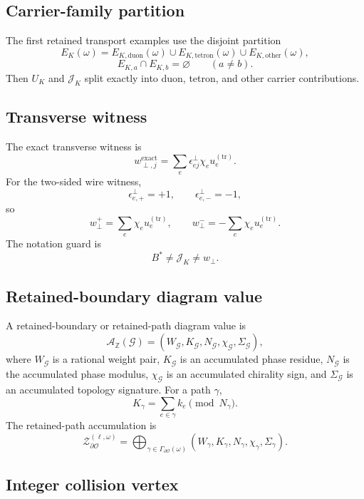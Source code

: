 \subsection{Carrier-family partition}
\label{appD:carrier-partition}

The first retained transport examples use the disjoint partition
\[
E_K(\omega)=E_{K,\mathrm{duon}}(\omega)\cup E_{K,\mathrm{tetron}}(\omega)\cup E_{K,\mathrm{other}}(\omega),
\]
\[
E_{K,a}\cap E_{K,b}=\varnothing\qquad(a\neq b).
\]
Then \(U_K\) and \(\mathcal J_K\) split exactly into duon, tetron, and other carrier contributions.

\subsection{Transverse witness}
\label{appD:transverse-witness}

The exact transverse witness is
\[
w_{\perp,j}^{\mathrm{exact}}=
\sum_e \epsilon_{ej}^{\perp}\chi_eu_e^{(\mathrm{tr})}.
\]
For the two-sided wire witness,
\[
\epsilon_{e,+}^{\perp}=+1,
\qquad
\epsilon_{e,-}^{\perp}=-1,
\]
so
\[
w_{\perp}^{+}=\sum_e\chi_eu_e^{(\mathrm{tr})},
\qquad
w_{\perp}^{-}=-\sum_e\chi_eu_e^{(\mathrm{tr})}.
\]
The notation guard is
\[
\boxed{B^*\neq \mathcal J_K\neq w_\perp}.
\]

\subsection{Retained-boundary diagram value}
\label{appD:retained-boundary-diagram-value}

A retained-boundary or retained-path diagram value is
\[
\mathcal A_{\mathbb Z}(\mathcal G)=
(W_{\mathcal G},K_{\mathcal G},N_{\mathcal G},\chi_{\mathcal G},\Sigma_{\mathcal G}),
\]
where \(W_{\mathcal G}\) is a rational weight pair, \(K_{\mathcal G}\) is an accumulated phase residue, \(N_{\mathcal G}\) is the accumulated phase modulus, \(\chi_{\mathcal G}\) is an accumulated chirality sign, and \(\Sigma_{\mathcal G}\) is an accumulated topology signature. For a path \(\gamma\),
\[
K_\gamma=\sum_{e\in\gamma}k_e\pmod{N_\gamma}.
\]
The retained-path accumulation is
\[
\mathcal Z_{\partial\mathcal O}^{(\ell,\omega)}=
\bigoplus_{\gamma\in\Gamma_{\partial\mathcal O}(\omega)}
(W_\gamma,K_\gamma,N_\gamma,\chi_\gamma,\Sigma_\gamma).
\]

\subsection{Integer collision vertex}
\label{appD:integer-collision-vertex}

